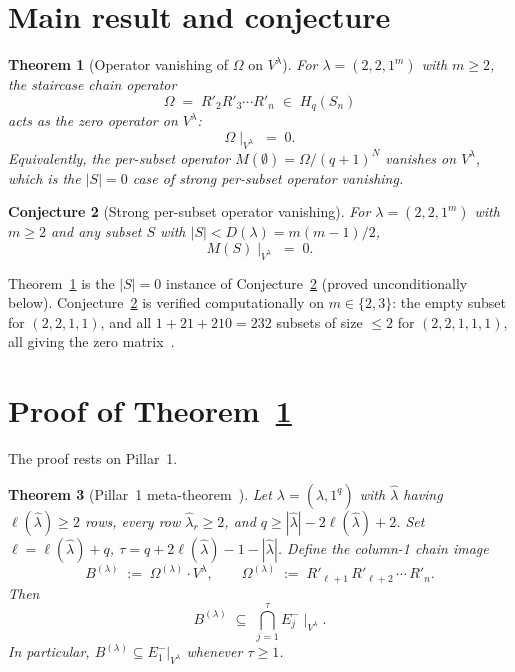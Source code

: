 \documentclass[11pt]{article}
\newtheorem{theorem}{Theorem}
\newtheorem{conjecture}[theorem]{Conjecture}
\theoremstyle{definition}
\newcommand{\Hq}{H_q}
\newcommand{\Sn}{S_n}
\newcommand{\Vlam}{V^\lambda}
\newcommand{\Om}{\Omega}
\newcommand{\Omtail}{\Om^{(\lambda)}}
\newcommand{\hatl}{\widehat\lambda}
\newcommand{\elh}{\ell(\hatl)}
\newcommand{\Rp}{R'}
\newcommand{\Eminus}[1]{E^-_{#1}}
\begin{document}
\section{Main result and conjecture}\label{sec:main}

\begin{theorem}[Operator vanishing of $\Om$ on $\Vlam$]\label{thm:omega-zero}
For $\lambda = (2,2,1^m)$ with $m \ge 2$, the staircase chain operator
\[
   \Om \;=\; \Rp_2 \Rp_3 \cdots \Rp_n \;\in\; \Hq(\Sn)
\]
acts as the zero operator on $\Vlam$:
\[
   \Om\!\mid_{\Vlam} \;=\; 0.
\]
Equivalently, the per-subset operator $M(\emptyset) = \Om/(q+1)^N$ vanishes
on $\Vlam$, which is the $|S|=0$ case of strong per-subset operator vanishing.
\end{theorem}

\begin{conjecture}[Strong per-subset operator vanishing]\label{conj:per-subset}
For $\lambda = (2,2,1^m)$ with $m \ge 2$ and any subset $S$ with
$|S| < D(\lambda) = m(m-1)/2$,
\[
   M(S)\!\mid_{\Vlam} \;=\; 0.
\]
\end{conjecture}

Theorem~\ref{thm:omega-zero} is the $|S|=0$ instance of
Conjecture~\ref{conj:per-subset} (proved unconditionally below).
Conjecture~\ref{conj:per-subset} is verified computationally on $m \in \{2,3\}$:
the empty subset for $(2,2,1,1)$, and all $1 + 21 + 210 = 232$ subsets of size
$\le 2$ for $(2,2,1,1,1)$, all giving the zero matrix~\cite{mem-strong}.

\section{Proof of Theorem~\ref{thm:omega-zero}}\label{sec:proof}

The proof rests on Pillar~1.

\begin{theorem}[Pillar~1 meta-theorem~\cite{pillar1}]\label{thm:pillar1}
Let $\lambda = (\hatl, 1^q)$ with $\hatl$ having $\elh \ge 2$ rows, every
row $\hatl_r \ge 2$, and $q \ge |\hatl| - 2\elh + 2$. Set $\ell = \elh + q$,
$\tau = q + 2\elh - 1 - |\hatl|$. Define the \emph{column-1 chain image}
\[
   B^{(\lambda)} \;:=\; \Omtail \cdot V^\lambda,
   \qquad
   \Omtail \;:=\; \Rp_{\ell+1}\, \Rp_{\ell+2}\, \cdots\, \Rp_n.
\]
Then
\[
   B^{(\lambda)} \;\subseteq\; \bigcap_{j=1}^{\tau} \Eminus j\!\mid_{\Vlam}.
\]
In particular, $B^{(\lambda)} \subseteq \Eminus 1|_{\Vlam}$ whenever
$\tau \ge 1$.
\end{theorem}
\end{document}
